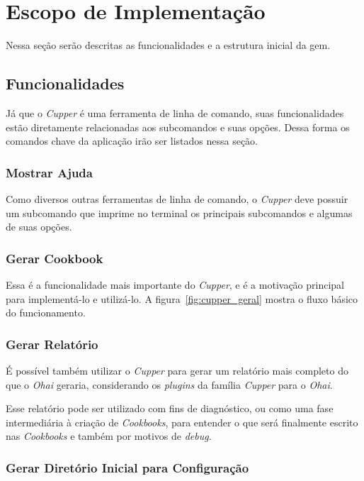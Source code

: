 \section{Escopo de Implementação}
\label{sec:escopo}
Nessa seção serão descritas as funcionalidades e a estrutura inicial da gem.

\subsection{Funcionalidades}

Já que o \textit{Cupper} é uma ferramenta de linha de comando, suas funcionalidades
estão diretamente relacionadas aos subcomandos e suas opções. Dessa forma os
comandos chave da aplicação irão ser listados nessa seção.

\subsubsection{Mostrar Ajuda}

Como diversos outras ferramentas de linha de comando, o \textit{Cupper} deve possuir
um subcomando que imprime no terminal os principais subcomandos e algumas de 
suas opções.

\subsubsection{Gerar Cookbook}

Essa é a funcionalidade mais importante do \textit{Cupper}, e é a motivação
principal para implementá-lo e utilizá-lo. A figura~\ref{fig:cupper_geral} mostra
o fluxo básico do funcionamento.

\subsubsection{Gerar Relatório}

É possível também utilizar o \textit{Cupper} para gerar um relatório mais
completo do que o \textit{Ohai} geraria, considerando os \textit{plugins} da
família \textit{Cupper} para o \textit{Ohai}.

Esse relatório pode ser utilizado com fins de diagnóstico, ou como uma fase 
intermediária à criação de \textit{Cookbooks}, para entender o que será finalmente 
escrito nas \textit{Cookbooks} e também por motivos de \textit{debug}.

\subsubsection{Gerar Diretório Inicial para Configuração}

